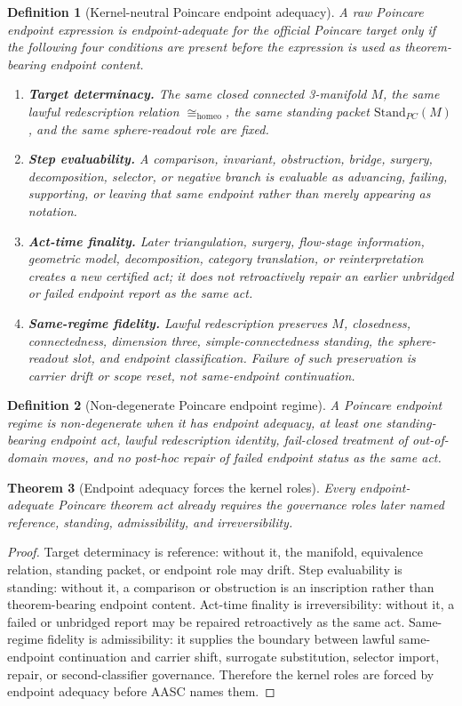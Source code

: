 \documentclass[11pt]{article}
\newtheorem{theorem}{Theorem}[section]
\newtheorem{definition}[theorem]{Definition}
\newcommand{\StandPC}{\mathrm{Stand}_{PC}}
\newcommand{\Homeo}{\cong_{\mathrm{homeo}}}
\begin{document}
\begin{definition}[Kernel-neutral Poincare endpoint adequacy]
A raw Poincare endpoint expression is endpoint-adequate for the official Poincare target only if the following four conditions are present before the expression is used as theorem-bearing endpoint content.
\begin{enumerate}[label=(A\arabic*)]
\item \textbf{Target determinacy.} The same closed connected 3-manifold \(M\), the same lawful redescription relation \(\Homeo\), the same standing packet \(\StandPC(M)\), and the same sphere-readout role are fixed.
\item \textbf{Step evaluability.} A comparison, invariant, obstruction, bridge, surgery, decomposition, selector, or negative branch is evaluable as advancing, failing, supporting, or leaving that same endpoint rather than merely appearing as notation.
\item \textbf{Act-time finality.} Later triangulation, surgery, flow-stage information, geometric model, decomposition, category translation, or reinterpretation creates a new certified act; it does not retroactively repair an earlier unbridged or failed endpoint report as the same act.
\item \textbf{Same-regime fidelity.} Lawful redescription preserves \(M\), closedness, connectedness, dimension three, simple-connectedness standing, the sphere-readout slot, and endpoint classification. Failure of such preservation is carrier drift or scope reset, not same-endpoint continuation.
\end{enumerate}
\end{definition}

\begin{definition}[Non-degenerate Poincare endpoint regime]
A Poincare endpoint regime is non-degenerate when it has endpoint adequacy, at least one standing-bearing endpoint act, lawful redescription identity, fail-closed treatment of out-of-domain moves, and no post-hoc repair of failed endpoint status as the same act.
\end{definition}

\begin{theorem}[Endpoint adequacy forces the kernel roles]\label{thm:adequacy-forces-kernel}
Every endpoint-adequate Poincare theorem act already requires the governance roles later named reference, standing, admissibility, and irreversibility.
\end{theorem}
\begin{proof}
Target determinacy is reference: without it, the manifold, equivalence relation, standing packet, or endpoint role may drift. Step evaluability is standing: without it, a comparison or obstruction is an inscription rather than theorem-bearing endpoint content. Act-time finality is irreversibility: without it, a failed or unbridged report may be repaired retroactively as the same act. Same-regime fidelity is admissibility: it supplies the boundary between lawful same-endpoint continuation and carrier shift, surrogate substitution, selector import, repair, or second-classifier governance. Therefore the kernel roles are forced by endpoint adequacy before AASC names them.
\end{proof}
\end{document}
